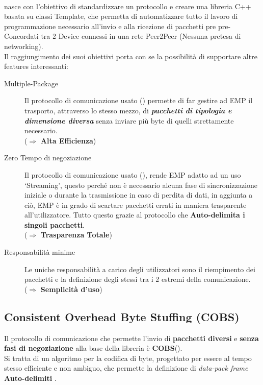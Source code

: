 \paragraph{\cite*{EMP}} nasce con l’obiettivo di standardizzare un protocollo e creare una libreria C++ basata su classi Template, che permetta di automatizzare tutto il lavoro di programmazione necessario all’invio e alla ricezione di pacchetti pre pre-Concordati tra 2 Device connessi in una rete Peer2Peer (Nessuna pretesa di networking).\\
Il raggiungimento dei suoi obiettivi porta con se la possibilità di supportare altre features interessanti:
\begin{spacing}{1.25}
\begin{description}
	\item[Multiple-Package] Il protocollo di comunicazione usato (\cite{COBS}) permette di far gestire ad EMP il trasporto, attraverso lo stesso mezzo, di \textit{\textbf{pacchetti di tipologia e dimensione diversa}} senza inviare più byte di quelli strettamente necessario.\\($\Rightarrow$ \textbf{Alta Efficienza})
	
	\item[Zero Tempo di negoziazione] Il protocollo di comunicazione usato (\cite{COBS}), rende EMP adatto ad un uso ‘Streaming’, questo perché non è necessario alcuna fase di sincronizzazione iniziale o durante la trasmissione in caso di perdita di dati, in aggiunta a ciò, EMP è in grado di scartare pacchetti errati in maniera trasparente all’utilizzatore. Tutto questo grazie al protocollo che \textbf{Auto-delimita i singoli pacchetti}.\\($\Rightarrow$ \textbf{Trasparenza Totale})
	\item[Responsabilità minime] Le uniche responsabilità a carico degli utilizzatori sono il riempimento dei pacchetti e la definizione degli stessi tra i 2 estremi della comunicazione.\\($\Rightarrow$ \textbf{Semplicità d'uso})
\end{description}
\end{spacing}

\subsection*{Consistent Overhead Byte Stuffing (COBS)}
Il protocollo di comunicazione che permette l’invio di \textbf{pacchetti diversi} e \textbf{senza fasi di negoziazione} alla base della libreria è \textbf{COBS}(\cite{COBS}).\\
Si tratta di un algoritmo per la codifica di byte, progettato per essere al tempo stesso efficiente e non ambiguo, che permette la definizione di \textit{data-pack frame} \textbf{Auto-delimiti} .

